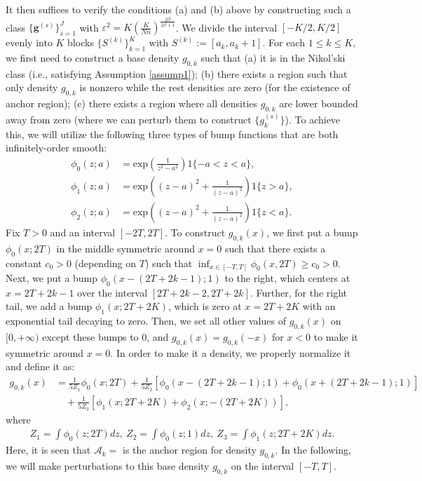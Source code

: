 \documentclass[preprint,11pt]{article}
\newcommand{\mcal}{\mathcal}
\numberwithin{equation}{section}
\begin{document}
It then suffices to verify the conditions (a) and (b) above by constructing such a class $\{\bm{g}^{(s)}\}_{s=1}^J$ with $\varepsilon^2 = K\left(\frac{K}{Nn}\right)^{\frac{2\beta}{2\beta+1}}$. We divide the interval $[-K/2,K/2]$ evenly into $K$ blocks $\{S^{(k)}\}_{k=1}^K$ with $S^{(k)}:=\left[a_k,a_k+1\right]$. For each $1\le k\le K$, we first need to construct a base density $g_{0,k}$ such that (a) it is in the Nikol’ski class (i.e., satisfying Assumption \ref{assump1}); (b) there exists a region such that only density $g_{0,k}$ is nonzero while the rest densities are zero (for the existence of anchor region); (c) there exists a region where all densities $g_{0,k}$ are lower bounded away from zero (where we can perturb them to construct $\{g_k^{(s)}\}$). To achieve this, we will utilize the following three types of bump functions that are both infinitely-order smooth:
\begin{align*}
    \phi_0(z;a) &= \text{exp}\left(\frac{1}{z^2-a^2}\right)1\{-a<z<a\},\\
    \phi_1(z;a)&=\text{exp}\left((z-a)^2+\frac{1}{(z-a)^2}\right)1\{z>a\},\\ \phi_2(z;a)&=\text{exp}\left((z-a)^2+\frac{1}{(z-a)^2}\right)1\{z<a\}.
\end{align*}
Fix $T>0$ and an interval $[-2T,2T]$. To construct $g_{0,k}(x)$, we first put a bump $\phi_0(x;2T)$ in the middle symmetric around $x=0$ such that there exists a constant $c_0>0$ (depending on $T$) such that $\inf_{x\in [-T,T]}\phi_0(x,2T)\ge c_0>0$. Next, we put a bump $\phi_0(x-(2T+2k-1);1)$ to the right, which centers at $x=2T+2k-1$ over the interval $[2T+2k-2,2T+2k]$. Further, for the right tail, we add a bump $\phi_1(x;2T+2K)$, which is zero at $x=2T+2K$ with an exponential tail decaying to zero. Then, we set all other values of $g_{0,k}(x)$ on $[0,+\infty)$ except these bumps to 0, and $g_{0,k}(x)=g_{0,k}(-x)$ for $x<0$ to make it symmetric around $x=0$. In order to make it a density, we properly normalize it and define it as:
\begin{align}\label{eq:g0kconstruction}
    g_{0,k}(x) &= \frac{1}{5Z_1}\phi_0(x;2T)+\frac{1}{5Z_2}\left[\phi_0(x-(2T+2k-1);1)+\phi_0(x+(2T+2k-1);1)\right]\\\nonumber
    &\quad+\frac{1}{5Z_3}\left[\phi_1(x;2T+2K)+\phi_2(x;-(2T+2K))\right],
\end{align}
where 
\begin{align*}
    Z_1 = \int \phi_0(z;2T)dz,\ Z_2=\int \phi_0(z;1)dz,\ Z_3 = \int \phi_1(z;2T+2K)dz.
\end{align*}
Here, it is seen that $\mcal{A}_k=$ is the anchor region for density $g_{0,k}$. In the following, we will make perturbations to this base density $g_{0,k}$ on the interval $[-T,T]$.
\end{document}
